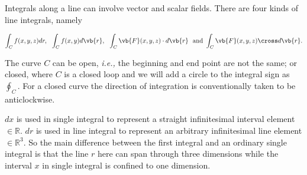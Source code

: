 \documentclass[english,a4paper,12pt]{report}
\begin{document}
Integrals along a line can involve vector and scalar fields. There are four kinds of line integrals, namely

\begin{equation}
	\int _{C} f(x,y,z) dr, ~~ \int_{C}^{} f(x,y) d\vb{r} , ~~ \int_{C}^{} \vb{F} (x,y,z) \cdot d\vb{r} ~ \text { and }  \int_{C}^{} \vb{F} (x,y,z) \cross d\vb{r} . 
\end{equation}

The curve \(C\) can be open, \textit{i.e.,} the beginning and end point are not the same; or closed, where \(C\) is a closed loop and we will add a circle to the integral sign as \(\oint_{C} \). For a closed curve the direction of integration is conventionally taken to be anticlockwise.

\(dx\) is used in single integral to represent a straight infinitesimal interval element \(\in \mathbb{R}\). \(dr\) is used in line integral to represent an arbitrary infinitesimal line element \(\in \mathbb{R}^3 \). So the main difference between the first integral and an ordinary single integral is that the line \(r\) here can span through three dimensions while the interval \(x\) in single integral is confined to one dimension.
\end{document}
